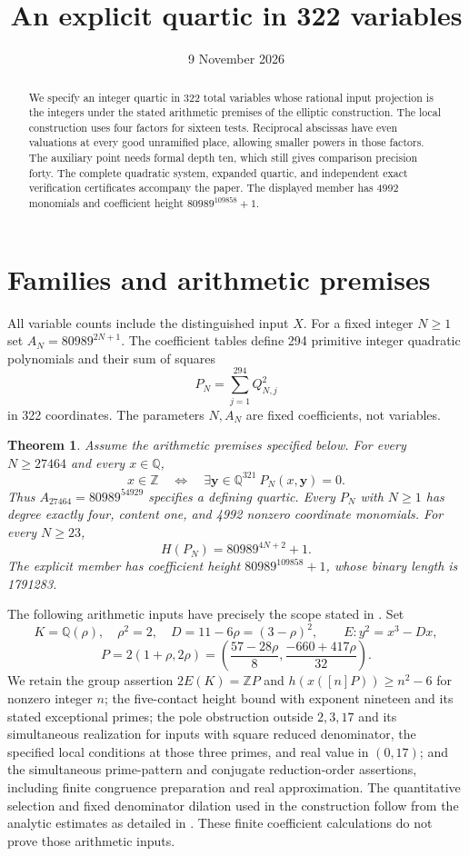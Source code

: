 \documentclass[11pt,a4paper]{article}
\title{An explicit quartic in 322 variables}
\author{}\date{9 November 2026}
\newtheorem{theorem}{Theorem}[section]
\theoremstyle{remark}\newtheorem{remark}[theorem]{Remark}
\newcommand{\Q}{\mathbb Q}\newcommand{\Z}{\mathbb Z}\newcommand{\HH}{\mathcal H}
\begin{document}
\maketitle
\begin{abstract}
We specify an integer quartic in 322 total variables whose rational input
projection is the integers under the stated arithmetic premises of the
elliptic construction. The local construction uses four factors for
sixteen tests. Reciprocal abscissas have even valuations at every good
unramified place, allowing smaller powers in those factors. The auxiliary
point needs formal depth ten, which still gives comparison precision
forty. The complete quadratic system, expanded quartic, and independent
exact verification certificates accompany the paper. The displayed
member has 4992 monomials and coefficient height $80989^{109858}+1$.
\end{abstract}

\section{Families and arithmetic premises}
All variable counts include the distinguished input $X$. For a fixed
integer $N\ge1$ set $A_N=80989^{2N+1}$. The coefficient tables define 294 primitive integer quadratic
polynomials and their sum of squares
\[
                     P_N=\sum_{j=1}^{294}Q_{N,j}^2
\]
in 322 coordinates. The parameters $N,A_N$ are fixed coefficients,
not variables.

\begin{theorem}\label{thm:families}
Assume the arithmetic premises specified below. For every $N\ge27464$
and every $x\in\Q$,
\[
 x\in\Z\quad\Longleftrightarrow\quad
 \exists\mathbf y\in\Q^{321}\ P_N(x,\mathbf y)=0.
\]
Thus $A_{27464}=80989^{54929}$ specifies a defining quartic.
Every $P_N$ with $N\ge1$ has degree exactly four, content one, and
4992 nonzero coordinate monomials. For every $N\ge23$,
\[
                         H(P_N)=80989^{4N+2}+1.
\]
The explicit member has coefficient height $80989^{109858}+1$,
whose binary length is 1791283.
\end{theorem}

The following arithmetic inputs have precisely the scope stated in
\cite{Dependencies,Shared,Explicit}. Set
\[
 K=\Q(\rho),\quad \rho^2=2,\quad D=11-6\rho=(3-\rho)^2,
 \qquad E:y^2=x^3-Dx,
\]
\[
 P=2(1+\rho,2\rho)
  =\left(\frac{57-28\rho}{8},\frac{-660+417\rho}{32}\right).
\]
We retain the group assertion $2E(K)=\Z P$ and
$h(x([n]P))\ge n^2-6$ for nonzero integer $n$; the five-contact
height bound with exponent nineteen and its stated exceptional primes;
the pole obstruction outside $2,3,17$ and its simultaneous realization
for inputs with square reduced denominator, the specified local
conditions at those three primes, and real value in $(0,17)$; and the
simultaneous prime-pattern and conjugate reduction-order assertions,
including finite congruence preparation and real approximation.
The quantitative selection and fixed denominator dilation used in the
construction follow from the analytic estimates as detailed in
\cite{Selection}. These finite coefficient calculations do not prove
those arithmetic inputs.
\end{document}
